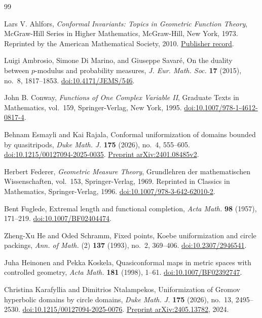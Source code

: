 \begin{thebibliography}{99}

Lars V. Ahlfors,
\emph{Conformal Invariants: Topics in Geometric Function Theory},
McGraw-Hill Series in Higher Mathematics,
McGraw-Hill, New York, 1973.
Reprinted by the American Mathematical Society, 2010.
\href{https://www.ams.org/bookpages/chel-371}{Publisher record}.

Luigi Ambrosio, Simone Di Marino, and Giuseppe Savar\'e,
On the duality between $p$-modulus and probability measures,
\emph{J. Eur. Math. Soc.} \textbf{17} (2015), no.~8, 1817--1853.
\href{https://doi.org/10.4171/JEMS/546}{doi:10.4171/JEMS/546}.

John B. Conway,
\emph{Functions of One Complex Variable II},
Graduate Texts in Mathematics, vol.~159,
Springer-Verlag, New York, 1995.
\href{https://doi.org/10.1007/978-1-4612-0817-4}{doi:10.1007/978-1-4612-0817-4}.

Behnam Esmayli and Kai Rajala,
Conformal uniformization of domains bounded by quasitripods,
\emph{Duke Math. J.} \textbf{175} (2026), no.~4, 555--605.
\href{https://doi.org/10.1215/00127094-2025-0035}
{doi:10.1215/00127094-2025-0035}.
\href{https://arxiv.org/abs/2401.08485v2}{Preprint arXiv:2401.08485v2}.

Herbert Federer,
\emph{Geometric Measure Theory},
Grundlehren der mathematischen Wissenschaften, vol.~153,
Springer-Verlag, 1969.
Reprinted in Classics in Mathematics, Springer-Verlag, 1996.
\href{https://doi.org/10.1007/978-3-642-62010-2}{doi:10.1007/978-3-642-62010-2}.

Bent Fuglede,
Extremal length and functional completion,
\emph{Acta Math.} \textbf{98} (1957), 171--219.
\href{https://doi.org/10.1007/BF02404474}{doi:10.1007/BF02404474}.

Zheng-Xu He and Oded Schramm,
Fixed points, Koebe uniformization and circle packings,
\emph{Ann. of Math.} (2) \textbf{137} (1993), no.~2, 369--406.
\href{https://doi.org/10.2307/2946541}{doi:10.2307/2946541}.

Juha Heinonen and Pekka Koskela,
Quasiconformal maps in metric spaces with controlled geometry,
\emph{Acta Math.} \textbf{181} (1998), 1--61.
\href{https://doi.org/10.1007/BF02392747}{doi:10.1007/BF02392747}.

Christina Karafyllia and Dimitrios Ntalampekos,
Uniformization of Gromov hyperbolic domains by circle domains,
\emph{Duke Math. J.} \textbf{175} (2026), no.~13, 2495--2530.
\href{https://doi.org/10.1215/00127094-2025-0076}
{doi:10.1215/00127094-2025-0076}.
\href{https://arxiv.org/abs/2405.13782}{Preprint arXiv:2405.13782}, 2024.


\end{thebibliography}
